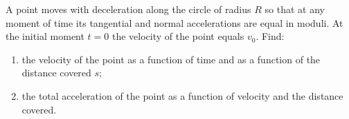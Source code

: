 
\item A point moves with deceleration along the circle of radius \( R \) so that at any moment of time its tangential and normal accelerations are equal in moduli. At the initial moment \( t = 0 \) the velocity of the point equals \( v_0 \). Find:
    \begin{center}
    \end{center}
    \begin{enumerate}
        \item the velocity of the point as a function of time and as a function of the distance covered \( s \);
        \item the total acceleration of the point as a function of velocity and the distance covered.
    \end{enumerate}
